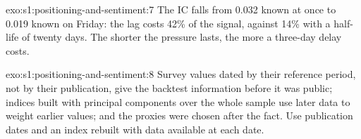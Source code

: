 \begin{solution}{exo:s1:positioning-and-sentiment:7}
The IC falls from 0.032 known at once to 0.019 known on Friday: the lag costs 42\% of the signal, against 14\% with a half-life of twenty days. The
shorter the pressure lasts, the more a three-day delay costs.
\end{solution}

\begin{solution}{exo:s1:positioning-and-sentiment:8}
Survey values dated by their reference period, not by their publication, give the backtest information before it was public; indices built with
principal components over the whole sample use later data to weight earlier values; and the proxies were chosen after the fact. Use publication dates
and an index rebuilt with data available at each date.
\end{solution}

